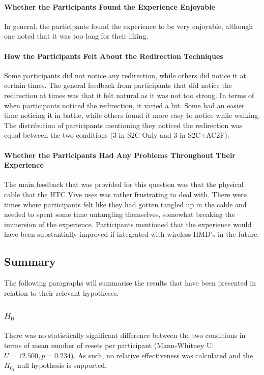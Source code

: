 \paragraph{Whether the Participants Found the Experience Enjoyable}
In general, the participants found the experience to be very enjoyable, although one noted that it was too long for their liking. 

\paragraph{How the Participants Felt About the Redirection Techniques}
Some participants did not notice any redirection, while others did notice it at certain times. The general feedback from participants that did notice the redirection at times was that it felt natural as it was not too strong. In terms of when participants noticed the redirection, it varied a bit. Some had an easier time noticing it in battle, while others found it more easy to notice while walking. The distribution of participants mentioning they noticed the redirection was equal between the two conditions (3 in S2C Only and 3 in S2C+AC2F). 

\paragraph{Whether the Participants Had Any Problems Throughout Their Experience}
The main feedback that was provided for this question was that the physical cable that the HTC Vive uses was rather frustrating to deal with. There were times where participants felt like they had gotten tangled up in the cable and needed to spent some time untangling themselves, somewhat breaking the immersion of the experience. Participants mentioned that the experience would have been substantially improved if integrated with wireless HMD's in the future. 

\subsection{Summary}
The following paragraphs will summarise the results that have been presented in relation to their relevant hypotheses.  

\subsubsection{$H_{0_1}$}
There was no statistically significant difference between the two conditions in terms of mean number of resets per participant (Mann-Whitney U: $U = 12.500, p = 0.234$). As such, no relative effectiveness was calculated and the $H_{0_1}$ null hypothesis is supported.

